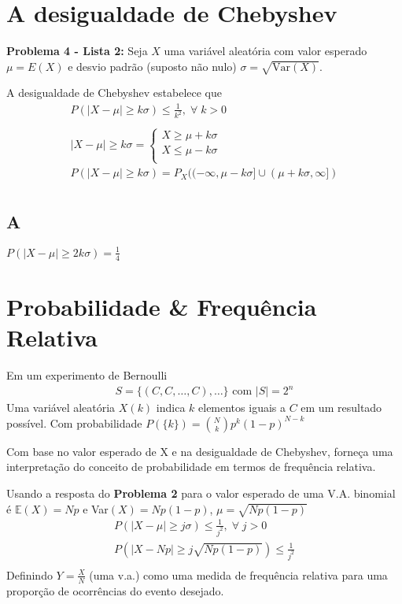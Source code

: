 \documentclass{article}
\renewcommand\bf[1]{\textbf{#1}}
\newcommand{\bb}[1]{\mathbb{#1}}
\begin{document}
\setlength{\abovedisplayskip}{12pt}
\setlength{\belowdisplayskip}{12pt}
\setlength{\abovedisplayshortskip}{0pt}
\setlength{\belowdisplayshortskip}{0pt}
\setlength{\jot}{1pt}

\section{A desigualdade de Chebyshev}
\bf{Problema 4 - Lista 2:} Seja $X$ uma variável aleatória com valor esperado $\mu = E(X)$ e desvio
padrão (suposto não nulo) $\sigma = \sqrt{\text{Var}(X)}$.

A desigualdade de Chebyshev estabelece que
\begin{align*}
P(|X - \mu| \geq k \sigma) \leq \frac{1}{k^2}, \; \forall \; k > 0 \\
\\
| X - \mu | \geq k \sigma =
\begin{cases}
    X \geq \mu + k \sigma \\
    X \leq \mu - k \sigma \\
\end{cases} \\
P(|X - \mu| \geq k \sigma) = P_X((-\infty, \mu-k\sigma] \cup (\mu+k\sigma, \infty]) \\[0.5em]
\end{align*}
\subsection*{A}
$P(|X - \mu| \geq 2k \sigma) = \frac{1}{4}$

\section{Probabilidade \& Frequência Relativa}

Em um experimento de Bernoulli
\begin{align*}
    S = \{(C,C,\ldots,C), \ldots \} \text{ com } |S| = 2^n
\end{align*}
Uma variável aleatória $X(k)$ indica $k$ elementos iguais a $C$ em um resultado possível.  Com
probabilidade $P(\{k\}) = {N \choose k} p^k (1-p)^{N-k}$

Com base no valor esperado de X e na desigualdade de Chebyshev, forneça uma interpretação do conceito de probabilidade em termos de frequência relativa.

Usando a resposta do \bf{Problema 2} para o valor esperado de uma V.A. binomial é $\bb{E}(X) = Np$
e Var$(X) = Np(1-p)$, $\mu = \sqrt{Np(1-p)}$
\begin{align*}
P(|X - \mu| \geq j \sigma) \leq \frac{1}{j^2}, \; \forall \; j > 0 \\
P(|X - Np| \geq j \sqrt{Np(1-p)}) \leq \frac{1}{j^2} \\[-1em]
\end{align*}
Definindo $Y = \frac{X}{N}$ (uma v.a.) como uma medida de frequência relativa para uma proporção de
ocorrências do evento desejado.
\end{document}
